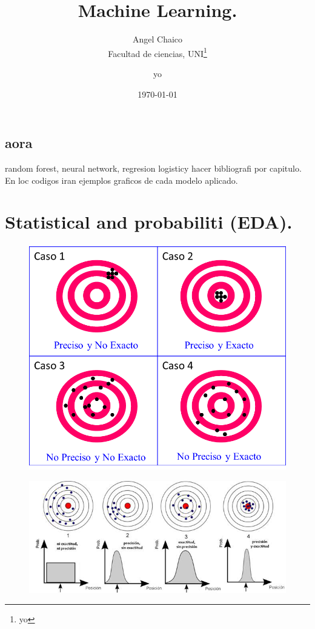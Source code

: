 \documentclass[12pt, a4paper]{book}
\title{Machine Learning.}
\date{\today}
\author{Angel Chaico\\Facultad de ciencias, 
	UNI\thanks{yo}
	\and yo}
\begin{document}
	\maketitle
	\tableofcontents
	
\chapter{aora}
random forest, neural network, regresion logisticy hacer bibliografi por capitulo.\\

En loc codigos iran ejemplos graficos de cada modelo aplicado.

\part{Statistical and probabiliti (EDA).}
\begin{figure}[H]
	\centering
	\includegraphics[scale=0.5]{exacto.png}
\end{figure}
\begin{figure}[H]
	\centering
	\includegraphics[scale=0.5]{presicion.jpg}
\end{figure}
\end{document}
